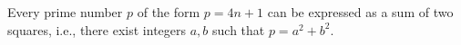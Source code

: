 Every prime number $p$ of the form $p = 4n + 1$ can be expressed as a sum of two squares, i.e., there exist integers $a, b$ such that $p = a^2 + b^2$.
